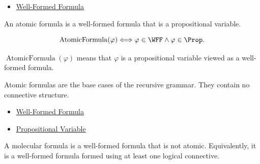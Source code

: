 \begin{dependencies}
\begin{itemize}
  \item \hyperref[def:well-formed-formula]{Well-Formed Formula}
\end{itemize}
\end{dependencies}
\begin{tcolorbox}[colback=propbox, colframe=propborder, arc=2pt,
  left=6pt, right=6pt, top=4pt, bottom=4pt,
  title={\small\textbf{Definition (Atomic Formula)}},
  fonttitle=\small\bfseries]
\begin{definition}
\label{def:atomic-formula-propositional-logic}
An atomic formula is a well-formed formula that is a propositional variable.
\end{definition}
\end{tcolorbox}

\begin{remark*}
\[
\operatorname{AtomicFormula}(\varphi)
\Longleftrightarrow
\varphi\in\WFF\land\varphi\in\Prop.
\]
\end{remark*}

\begin{remark*}
\(\operatorname{AtomicFormula}(\varphi)\) means that \(\varphi\) is a propositional variable viewed as a well-formed formula.
\end{remark*}

\begin{remark*}[Interpretation]
Atomic formulas are the base cases of the recursive grammar. They contain no connective structure.
\end{remark*}

\begin{dependencies}
\begin{itemize}
  \item \hyperref[def:well-formed-formula]{Well-Formed Formula}
  \item \hyperref[def:propositional-variable]{Propositional Variable}
\end{itemize}
\end{dependencies}
\begin{tcolorbox}[colback=propbox, colframe=propborder, arc=2pt,
  left=6pt, right=6pt, top=4pt, bottom=4pt,
  title={\small\textbf{Definition (Molecular Formula)}},
  fonttitle=\small\bfseries]
\begin{definition}
\label{def:molecular-formula-propositional-logic}
A molecular formula is a well-formed formula that is not atomic. Equivalently, it is a well-formed formula formed using at least one logical connective.
\end{definition}
\end{tcolorbox}


